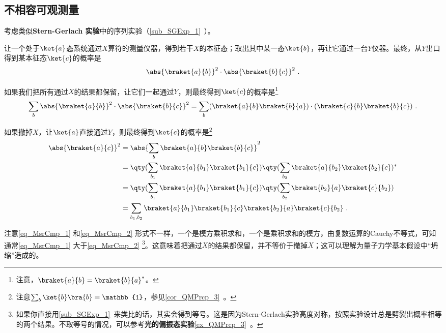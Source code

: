 \subsection{不相容可观测量}


考虑类似\textbf{Stern-Gerlach 实验}中的序列实验（\autoref{sub_SGExp_1}~）。

让一个处于$\ket{a}$态系统通过$X$算符的测量仪器，得到若干$X$的本征态；取出其中某一态$\ket{b}$，再让它通过一台$Y$仪器。最终，从$Y$出口得到某本征态$\ket{c}$的概率是
\begin{equation}
\abs{\braket{a}{b}}^2\cdot\abs{\braket{b}{c}}^2~.
\end{equation}

如果我们把所有通过$X$的结果都保留，让它们一起通过$Y$，则最终得到$\ket{c}$的概率是\footnote{注意，$\braket{a}{b}=\braket{b}{a}^*$。}
\begin{equation}\label{eq_MsrCmp_1}
\sum_{b}\abs{\braket{a}{b}}^2\cdot\abs{\braket{b}{c}}^2=\sum_{b}(\braket{a}{b}\braket{b}{a})\cdot(\braket{c}{b}\braket{b}{c})~.
\end{equation}

如果撤掉$X$，让$\ket{a}$直接通过$Y$，则最终得到$\ket{c}$的概率是\footnote{注意$\sum_{b}\ket{b}\bra{b}=\mathbb{1}$，参见\autoref{cor_QMPrcp_3}~。}
\begin{equation}\label{eq_MsrCmp_2}
\begin{aligned}
\abs{\braket{a}{c}}^2&=\abs{\sum_{b}\braket{a}{b}\braket{b}{c}}^2\\
&=\qty(\sum_{b_1}\braket{a}{b_1}\braket{b_1}{c})\qty(\sum_{b_2}\braket{a}{b_2}\braket{b_2}{c})^*\\
&=\qty(\sum_{b_1}\braket{a}{b_1}\braket{b_1}{c})\qty(\sum_{b_2}\braket{b_2}{a}\braket{c}{b_2})\\
&=\sum_{b_1, b_2}\braket{a}{b_1}\braket{b_1}{c}\braket{b_2}{a}\braket{c}{b_2}~.
\end{aligned}
\end{equation}

注意\autoref{eq_MsrCmp_1} 和\autoref{eq_MsrCmp_2} 形式不一样，一个是模方乘积求和，一个是乘积求和的模方，由复数运算的Cauchy不等式，可知通常\autoref{eq_MsrCmp_1} 大于\autoref{eq_MsrCmp_2} \footnote{如果你直接用\autoref{sub_SGExp_1}~来类比的话，其实会得到等号。这是因为Stern-Gerlach实验高度对称，按照实验设计总是劈裂出概率相等的两个结果。不取等号的情况，可以参考\textbf{光的偏振态实验}\autoref{ex_QMPrcp_3}~。}。这意味着把通过$X$的结果都保留，并不等价于撤掉$X$；这可以理解为量子力学基本假设中“坍缩”造成的。

